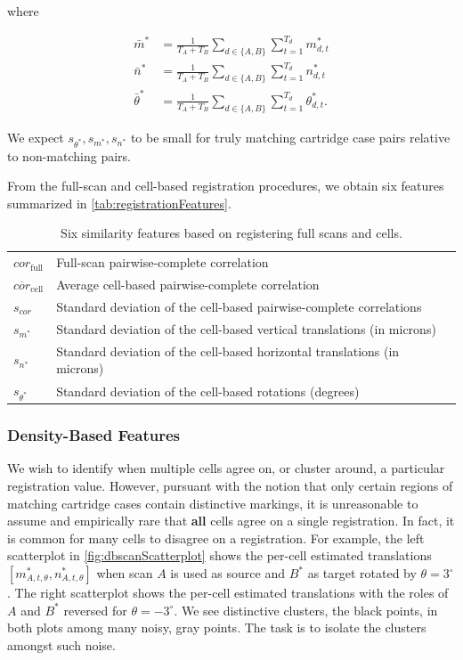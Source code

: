 \documentclass[preprint]{JASA}
\begin{document}
where

\begin{align*}
\bar{m}^* &= \frac{1}{T_A + T_B} \sum_{d \in \{A,B\}}\sum_{t=1}^{T_d} m^*_{d,t} \\
\bar{n}^* &= \frac{1}{T_A + T_B} \sum_{d \in \{A,B\}} \sum_{t=1}^{T_d} n^*_{d,t} \\
\bar{\theta}^* &= \frac{1}{T_A + T_B} \sum_{d \in \{A,B\}} \sum_{t=1}^{T_d} \theta^*_{d,t}.
\end{align*}

We expect \(s_{\theta^*}, s_{m^*},s_{n^*}\) to be small for truly
matching cartridge case pairs relative to non-matching pairs.

From the full-scan and cell-based registration procedures, we obtain six
features summarized in \autoref{tab:registrationFeatures}.

\begin{table}[htbp]
\centering
\begin{tabular}{p{.11\linewidth} p{.7\linewidth}}
$cor_{\text{full}}$ & Full-scan pairwise-complete correlation \\
$\overline{cor}_{\text{cell}}$ & Average cell-based pairwise-complete correlation \\
$s_{cor}$ & Standard deviation of the cell-based pairwise-complete correlations \\
$s_{m^*}$ & Standard deviation of the cell-based vertical translations (in microns) \\
$s_{n^*}$ & Standard deviation of the cell-based horizontal translations (in microns) \\
$s_{\theta^*}$ & Standard deviation of the cell-based rotations (degrees)
\end{tabular}
\caption{Six similarity features based on registering full scans and cells.}
\label{tab:registrationFeatures}
\end{table}

\hypertarget{density-based-features}{%
\subsubsection{Density-Based Features}\label{density-based-features}}

We wish to identify when multiple cells agree on, or cluster around, a
particular registration value. However, pursuant with the notion that
only certain regions of matching cartridge cases contain distinctive
markings, it is unreasonable to assume and empirically rare that
\textbf{all} cells agree on a single registration. In fact, it is common
for many cells to disagree on a registration. For example, the left
scatterplot in \autoref{fig:dbscanScatterplot} shows the per-cell
estimated translations \([m^*_{A,t,\theta}, n^*_{A,t,\theta}]\) when
scan \(A\) is used as source and \(B^*\) as target rotated by
\(\theta = 3^\circ\). The right scatterplot shows the per-cell estimated
translations with the roles of \(A\) and \(B^*\) reversed for
\(\theta = -3^\circ\). We see distinctive clusters, the black points, in
both plots among many noisy, gray points. The task is to isolate the
clusters amongst such noise.
\end{document}
